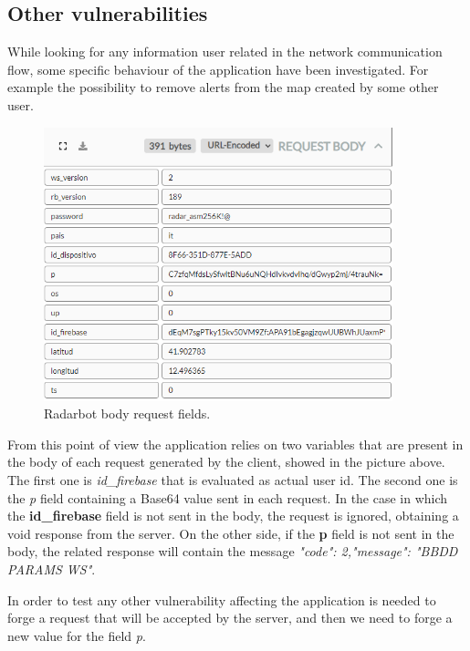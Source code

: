 	\subsection{Other vulnerabilities}
		\par While looking for any information user related in the network communication flow, some specific behaviour of the application have been investigated. For example the possibility to remove alerts from the map created by some other user. \newline
		\begin{figure}[ht]
			\centering
			\includegraphics[width=0.9\textwidth]{images/radarbot_request.png}
			\caption{Radarbot body request fields.}
		\end{figure}
		\newpage
		\par From this point of view the application relies on two variables that are present in the body of each request generated by the client, showed in the picture above. The first one is \textit{id\_firebase} that is evaluated as actual user id. The second one is the \textit{p} field containing a Base64 value sent in each request. \newline
		In the case in which the \textbf{id\_firebase} field is not sent in the body, the request is ignored, obtaining a void response from the server. \newline
		On the other side, if the \textbf{p} field is not sent in the body, the related response will contain the message \textit{"code": 2,"message": "BBDD PARAMS WS"}. \newline
		\par In order to test any other vulnerability affecting the application is needed to forge a request that will be accepted by the server, and then we need to forge a new value for the field \textit{p}.
		
